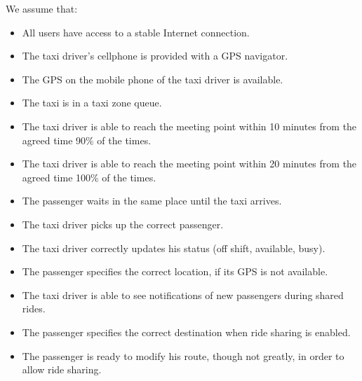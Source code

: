 We assume that:
\begin{itemize}
    \item All users have access to a stable Internet connection.
    \item The taxi driver's cellphone is provided with a GPS navigator.
    \item The GPS on the mobile phone of the taxi driver is available.
    \item The taxi is in a taxi zone queue.
    \item The taxi driver is able to reach the meeting point within 10 minutes from the agreed time 90\% of the times.
    \item The taxi driver is able to reach the meeting point within 20 minutes from the agreed time 100\% of the times.
    \item The passenger waits in the same place until the taxi arrives.
    \item The taxi driver picks up the correct passenger.
    \item The taxi driver correctly updates his status (off shift, available, busy).
    \item The passenger specifies the correct location, if its GPS is not available.
    \item The taxi driver is able to see notifications of new passengers during shared rides.
    \item The passenger specifies the correct destination when ride sharing is enabled.
    \item The passenger is ready to modify his route, though not greatly, in order to allow ride sharing.
\end{itemize}
